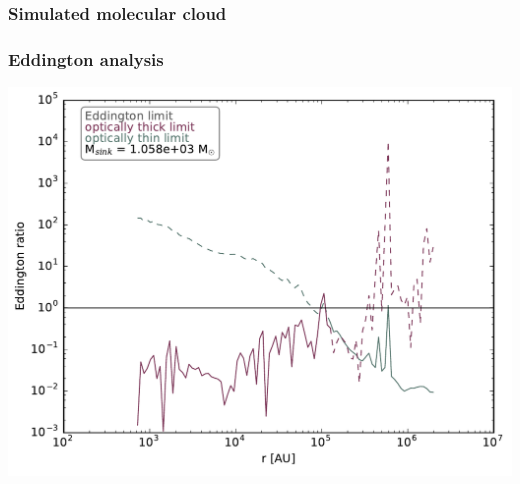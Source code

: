 \documentclass{beamer}
\begin{document}
\begin{frame}
\frametitle{Simulated molecular cloud}
 \centering
\end{frame}
\begin{frame}
\frametitle{Eddington analysis}
 \colorbox{white}{\includegraphics[width=0.8\paperwidth]{../Figures/cloud_profiles/eddington_limits.pdf}}
\end{frame}
\end{document}
